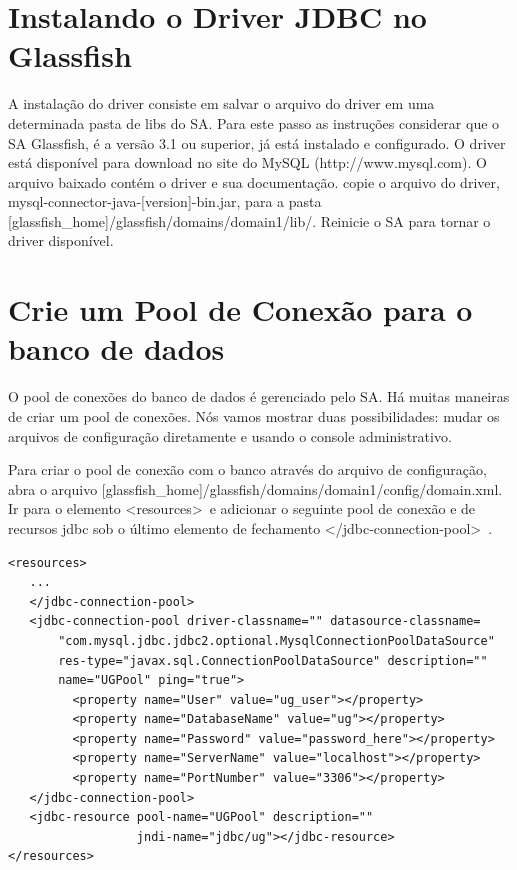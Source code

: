 \documentclass[envcountsame,envcountchap,letterpaper]{svmono}
\begin{document}
\section{Instalando o Driver JDBC no Glassfish}

A instalação do driver consiste em salvar o arquivo do driver em uma determinada pasta de libs do SA. Para este passo as instruções considerar que o SA Glassfish, é a versão 3.1 ou superior, já está instalado e configurado. O driver está disponível para download no site do MySQL (http://www.mysql.com). O arquivo baixado contém o driver e sua documentação. copie o arquivo do driver, mysql-connector-java-[version]-bin.jar, para a pasta [glassfish\_home]/glassfish/domains/domain1/lib/. Reinicie o SA para tornar o driver disponível.

\section{Crie um Pool de Conexão para o banco de dados}
\label{sec:creating-database-connection-pool}

O pool de conexões do banco de dados é gerenciado pelo SA. Há muitas maneiras de criar um pool de conexões. Nós vamos mostrar duas possibilidades: mudar os arquivos de configuração diretamente e usando o console administrativo.

Para criar o pool de conexão com o banco através do arquivo de configuração, abra o arquivo [glassfish\_home]/glassfish/domains/domain1/config/domain.xml. Ir para o elemento \textless resources\textgreater \ e adicionar o seguinte pool de conexão e de recursos jdbc sob o último elemento de fechamento \textless /jdbc-connection-pool\textgreater \ .

\begin{verbatim}
<resources>
   ...
   </jdbc-connection-pool>
   <jdbc-connection-pool driver-classname="" datasource-classname=
       "com.mysql.jdbc.jdbc2.optional.MysqlConnectionPoolDataSource"
       res-type="javax.sql.ConnectionPoolDataSource" description="" 
       name="UGPool" ping="true">
         <property name="User" value="ug_user"></property>
         <property name="DatabaseName" value="ug"></property>
         <property name="Password" value="password_here"></property>
         <property name="ServerName" value="localhost"></property>
         <property name="PortNumber" value="3306"></property>
   </jdbc-connection-pool>
   <jdbc-resource pool-name="UGPool" description="" 
                  jndi-name="jdbc/ug"></jdbc-resource>
</resources>
\end{verbatim}
\end{document}
